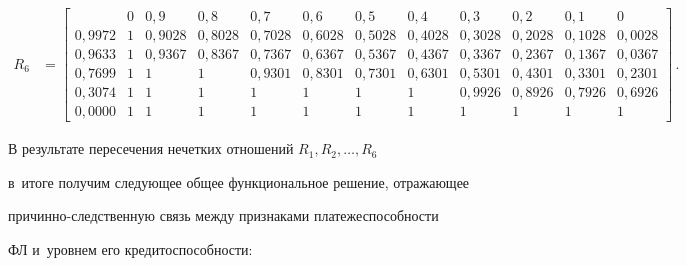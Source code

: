 {\begin{align*}
R_6&= \left[

\begin{array}{c|ccccccccccc}

&0&0{,}9& 0{,}8& 0{,}7& 0{,}6& 0{,}5& 0{,}4& 0{,}3& 0{,}2& 0{,}1&0\\

\hline

0{,}9972&1& 0{,}9028& 0{,}8028&0{,}7028&0{,}6028&0{,}5028&0{,}4028& 0{,}3028&0{,}2028&0{,}1028&

0{,}0028\\

0{,}9633& 1& 0{,}9367&0{,}8367&0{,}7367&0{,}6367&0{,}5367&0{,}4367&0{,}3367&0{,}2367&0{,}1367&0{,}0367\\

0{,}7699& 1& 1& 1& 0{,}9301&0{,}8301&0{,}7301&0{,}6301&0{,}5301&0{,}4301&0{,}3301& 0{,}2301\\

0{,}3074 & 1& 1& 1& 1& 1& 1& 1&0{,}9926& 0{,}8926& 0{,}7926& 0{,}6926\\

0{,}0000 & 1& 1&1&1&1&1& 1&1&1&1&1

\end{array}

\right]\,.

\end{align*}

}



  В результате пересечения нечетких отношений $R_1, R_2,\ldots , R_6$ 

в~итоге получим следующее общее функциональное решение, отражающее  

при\-чин\-но-след\-ст\-вен\-ную связь между признаками платежеспособности 

ФЛ и~уровнем его кредитоспособности:



\vspace*{6pt}

 

\noindent

